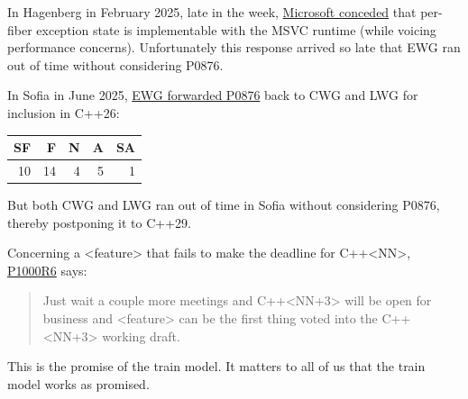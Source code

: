 In Hagenberg in February 2025, late in the week,
\href{https://lists.isocpp.org/ext/2025/02/25138.php}{Microsoft conceded} that
per-fiber exception state is implementable with the MSVC runtime (while voicing
performance concerns). Unfortunately this response arrived so late that EWG
ran out of time without considering P0876.

In Sofia in June 2025,
\href{https://docs.google.com/document/d/1wItX212LurEjkJK53XxnxumciqTRzxTSTJ48GwFihpE/edit?tab=t.0#heading=h.zc6lxwkrnobj}{EWG forwarded P0876}
back to CWG and LWG for inclusion in C++26:

\begin{table}[ht]
\begin{tabular}{|r|r|r|r|r|} %
\hline %
SF & F & N & A & SA \\ [0.5ex] %
\hline %
10 & 14 & 4 & 5 & 1 \\ %
\hline %
\end{tabular}
\end{table}

But both CWG and LWG ran out of time in Sofia without considering P0876,
thereby postponing it to C++29.

Concerning a <feature> that fails to make the deadline for C++<NN>,
\href{https://www.open-std.org/jtc1/sc22/wg21/docs/papers/2024/p1000r6.pdf}{P1000R6}
says:
\begin{quote}
Just wait a couple more meetings and C++<NN+3> will be open for business and <feature> can be
the first thing voted into the C++<NN+3> working draft.
\end{quote}

This is the promise of the train model. It matters to all of us that the train
model works as promised.
